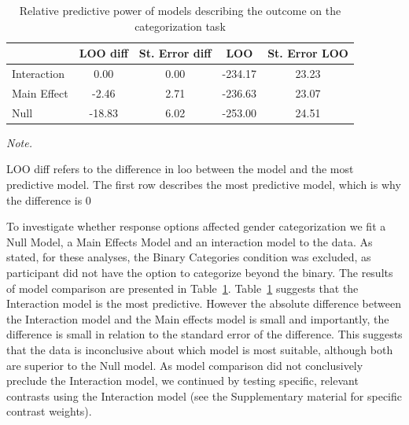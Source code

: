 \documentclass[
  man]{apa7}
\begin{document}
\begin{table}

\caption{\label{tab:loo}Relative predictive power of models describing the outcome on the categorization task}
\centering
\begin{threeparttable}
\begin{tabular}[t]{lcccc}
\toprule
  & LOO diff & St. Error diff & LOO & St. Error LOO\\
\midrule
Interaction & 0.00 & 0.00 & -234.17 & 23.23\\
Main Effect & -2.46 & 2.71 & -236.63 & 23.07\\
Null & -18.83 & 6.02 & -253.00 & 24.51\\
\bottomrule
\end{tabular}
\begin{tablenotes}[para]
\item \textit{Note.} 
\item LOO diff refers to the difference in loo between the model and the most predictive model. The first row describes the most predictive model, which is why the difference is 0
\end{tablenotes}
\end{threeparttable}
\end{table}

To investigate whether response options affected gender categorization we fit a Null Model, a Main Effects Model and an interaction model to the data. As stated, for these analyses, the Binary Categories condition was excluded, as participant did not have the option to categorize beyond the binary. The results of model comparison are presented in Table~\ref{tab:loo}.
Table~\ref{tab:loo} suggests that the Interaction model is the most predictive. However the absolute difference between the Interaction model and the Main effects model is small and importantly, the difference is small in relation to the standard error of the difference. This suggests that the data is inconclusive about which model is most suitable, although both are superior to the Null model. As model comparison did not conclusively preclude the Interaction model, we continued by testing specific, relevant contrasts using the Interaction model (see the Supplementary material for specific contrast weights).
\end{document}
